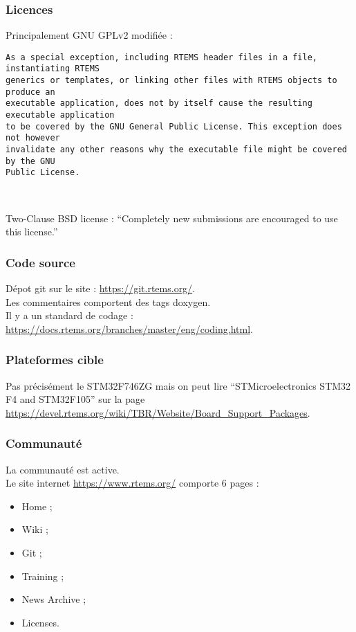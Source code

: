 \subsubsection{Licences}
Principalement GNU GPLv2 modifiée :
{\small
\begin{verbatim}
As a special exception, including RTEMS header files in a file, instantiating RTEMS
generics or templates, or linking other files with RTEMS objects to produce an
executable application, does not by itself cause the resulting executable application
to be covered by the GNU General Public License. This exception does not however
invalidate any other reasons why the executable file might be covered by the GNU
Public License.
\end{verbatim}\\
}
Two-Clause BSD license : \enquote{Completely new submissions are encouraged to use
this license.}

\subsubsection{Code source}
Dépot git sur le site : \url{https://git.rtems.org/}.\\

Les commentaires comportent des tags doxygen.\\

Il y a un standard de codage :
\url{https://docs.rtems.org/branches/master/eng/coding.html}.

\subsubsection{Plateformes cible}
Pas précisément le STM32F746ZG mais on peut lire \enquote{STMicroelectronics STM32 F4
and STM32F105} sur la page
\url{https://devel.rtems.org/wiki/TBR/Website/Board\_Support\_Packages}.

\subsubsection{Communauté}
La communauté est active.\\

Le site internet \url{https://www.rtems.org/} comporte 6 pages :
\begin{itemize}
	\item Home ;
	\item Wiki ;
	\item Git ;
	\item Training ;
	\item News Archive ;
	\item Licenses.\\
\end{itemize}

